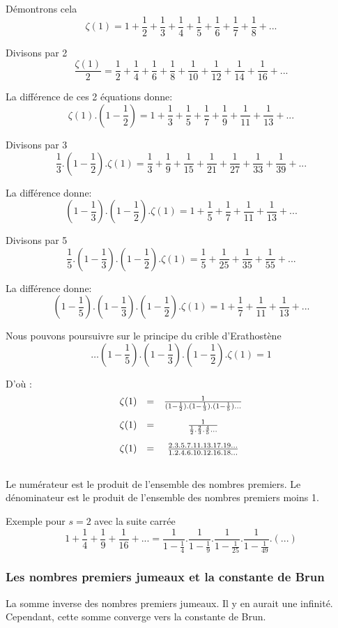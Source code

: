 Démontrons cela
\[\zeta(1) = 1+ \frac{1}{2} + \frac{1}{3} + \frac{1}{4} + \frac{1}{5}+ \frac{1}{6}+ \frac{1}{7} +  \frac{1}{8} +... \]

Divisons par 2
\[ \frac{\zeta(1)}{2} = \frac{1}{2}+\frac{1}{4}+\frac{1}{6}+\frac{1}{8}+\frac{1}{10}+\frac{1}{12} + \frac{1}{14}+ \frac{1}{16}+... \]
 
La différence de ces 2 équations donne:
\[ \zeta(1).(1-\frac{1}{2}) = 1 + \frac{1}{3}+\frac{1}{5}+\frac{1}{7}+\frac{1}{9}+\frac{1}{11}+\frac{1}{13}+ ... \]

Divisons par 3
\[ \frac{1}{3}.(1-\frac{1}{2}).\zeta(1) = \frac{1}{3} + \frac{1}{9}+\frac{1}{15}+\frac{1}{21}+\frac{1}{27}+ \frac{1}{33}+ \frac{1}{39}+... \]

La différence donne:
\[ (1-\frac{1}{3}).(1-\frac{1}{2}).\zeta(1) = 1 + \frac{1}{5} + \frac{1}{7}+\frac{1}{11}+\frac{1}{13}+ ... \]

Divisons par 5
\[ \frac{1}{5}.(1-\frac{1}{3}).(1-\frac{1}{2}).\zeta(1) =    \frac{1}{5} + \frac{1}{25}+\frac{1}{35}+\frac{1}{55}+ ... \]

La différence donne:
\[(1-\frac{1}{5}).(1-\frac{1}{3}).(1-\frac{1}{2}).\zeta(1) = 1 + \frac{1}{7}+\frac{1}{11}+\frac{1}{13}+... \]

Nous pouvons poursuivre sur le principe du crible d'Erathostène
\[ \ldots(1-\frac{1}{5}).(1-\frac{1}{3}).(1-\frac{1}{2}).\zeta(1) = 1 \]

D'où :
$$
\begin{array}{ccc}
\zeta(1) &=& \frac{1}{(1-\frac{1}{2}).(1-\frac{1}{3}).(1-\frac{1}{5})\ldots} \\[\bigskipamount]
\zeta(1) &=& \frac{1}{\frac{1}{2}.\frac{2}{3}.\frac{4}{5}\ldots} 		\\[\bigskipamount]
\zeta(1) &=&  \frac{2.3.5.7.11.13.17.19...}{1.2.4.6.10.12.16.18...} \\[\bigskipamount]
\end{array}
$$

Le numérateur est le produit de l'ensemble des nombres premiers.
Le dénominateur est le produit de l'ensemble des nombres premiers moins 1.


Exemple pour $s=2$ avec la suite carrée
\[ 1+ \frac{1}{4} + \frac{1}{9} + \frac{1}{16} + ...  =  \frac{1}{1-\frac{1}{4}} .\frac{1}{1-\frac{1}{9}}.\frac{1}{1-\frac{1}{25}}.\frac{1}{1-\frac{1}{49}}. (...) \]



\subsubsection{Les nombres premiers jumeaux et la constante de Brun}
La somme inverse des nombres premiers jumeaux. Il y en aurait une infinité. Cependant, cette somme
 converge vers la constante de Brun.



